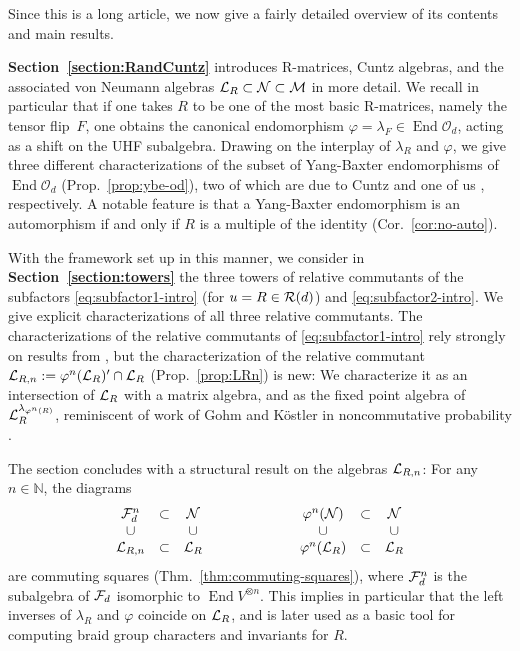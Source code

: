 \documentclass[12pt,a4paper]{amsart}
\numberwithin{equation}{section}
\theoremstyle{remark}
\def\End{\operatorname{End}}
\newcommand{\tp}[1]{^{\otimes #1}}    %
\newcommand{\Nl}{\mathbb{N}}
\newcommand{\la}{\lambda}
\newcommand{\CM}[0]{\mathcal{M}} \newcommand{\CN}[0]{\mathcal{N}}
\newcommand{\CO}[0]{\mathcal{O}} \newcommand{\CP}[0]{\mathcal{P}}
\begin{document}
\bigskip

Since this is a long article, we now give a fairly detailed overview of its contents and main results. 

{\bf Section~\ref{section:RandCuntz}} introduces R-matrices, Cuntz algebras, and the associated von Neumann algebras $\CL_R\subset\CN\subset\CM$ in more detail. We recall in particular that if one takes $R$ to be one of the most basic R-matrices, namely the tensor flip~$F$, one obtains the canonical endomorphism $\varphi=\la_F\in\End\CO_d$, acting as a shift on the UHF subalgebra. Drawing on the interplay of $\la_R$ and $\varphi$, we give three different characterizations of the subset of Yang-Baxter endomorphisms of $\End\CO_d$ (Prop.~\ref{prop:ybe-od}), two of which are due to Cuntz \cite{Cuntz:1998} and one of us \cite{ContiHongSzymanski:2012}, respectively. A notable feature is that a Yang-Baxter endomorphism is an automorphism if and only if $R$ is a multiple of the identity (Cor.~\ref{cor:no-auto}).


With the framework set up in this manner, we consider in {\bf Section~\ref{section:towers}} the three towers of relative commutants of the subfactors \eqref{eq:subfactor1-intro} (for $u=R\in\mathcal{R}(d)$) and \eqref{eq:subfactor2-intro}. We give explicit characterizations of all three relative commutants. The characterizations of the relative commutants of \eqref{eq:subfactor1-intro} rely strongly on results from \cite{ContiPinzari:1996,Akemann:1997,Longo:1994_2}, but the characterization of the relative commutant $\mathcal{L}_{R,n}:=\varphi^n(\mathcal{L}_R)'\cap\mathcal{L}_R$ (Prop.~\ref{prop:LRn}) is new: We characterize it as an intersection of $\mathcal{L}_R$ with a matrix algebra, and as the fixed point algebra of~$\CL_R^{\la_{\varphi^n(R)}}$, reminiscent of work of Gohm and K\"ostler in noncommutative probability \cite{GohmKostler:2009_2}.

The section concludes with a structural result on the algebras $\mathcal{L}_{R,n}$: For any $n\in\Nl$, the diagrams
\begin{align}\label{eq:commutingsquare2-pre}
    \begin{array}{ccc}
        \CF_d^n &\subset &\CN
        \\
        \cup & & \cup
        \\
        \CL_{R,n} &\subset &\CL_R
    \end{array}
    \qquad\qquad\qquad
    \begin{array}{ccc}
        \varphi^n(\CN) &\subset &\CN
        \\
        \cup & & \cup
        \\
        \varphi^n(\CL_R) &\subset &\CL_R
    \end{array}
\end{align}
are commuting squares (Thm.~\ref{thm:commuting-squares}), where $\mathcal{F}_d^n$ is the subalgebra of $\mathcal{F}_d$ isomorphic to $\End V\tp{n}$. This implies in particular that the left inverses of $\la_R$ and $\varphi$ coincide on $\mathcal{L}_R$, and is later used as a basic tool for computing braid group characters and invariants for $R$.
    
\end{document}
